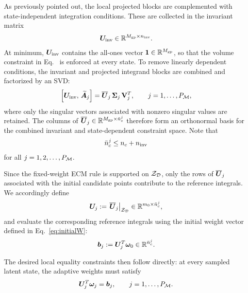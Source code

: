 \documentclass[preprint,10pt]{elsarticle}  %
\begin{document}
As previously pointed out,  the local projected blocks are complemented  with state-independent
integration conditions. These are collected in the invariant matrix
\begin{equation}
\label{eq:invariants1}
\boldsymbol{U}_{\mathrm{inv}}
\in
\mathbb{R}^{M_{\mathrm{gp}}\times n_{\mathrm{inv}}}.
\end{equation}
At minimum, \(\boldsymbol{U}_{\mathrm{inv}}\) contains the all-ones vector
\(\bm{1} \in \mathbb{R}^{M_{\mathrm{gp}}}{}\), so that the volume constraint in
Eq.~ is enforced at every
state. To remove linearly dependent conditions, the invariant and projected
integrand blocks are combined and factorized by an SVD:
\begin{equation}
\label{eq:invariants}
\left[
\boldsymbol{U}_{\mathrm{inv}},\,
\widetilde{\bm{A}}_j
\right]
=
\overline{\bm{U}}_{j}\,
\boldsymbol{\Sigma}_j\,
\mathbf{V}_j^{T},
\qquad
j=1,\ldots,P_{\mathcal{M}} ,
\end{equation}
where only the singular vectors associated with nonzero singular values
are retained. The columns of
\(\overline{\bm{U}}_{j}\in\mathbb{R}^{M_{\mathrm{gp}} \times \bar{n}_c^{j}}\)  therefore form an orthonormal
basis for the combined invariant and state-dependent constraint space. Note that
\begin{equation}
\label{eq:nconstrainsBOUND}
  \bar{n}_c^{j} \le  n_c + n_{\mathrm{inv}}
\end{equation}
for all $j=1,2,\ldots,P_{\mathcal{M}}$.



Since the fixed-weight ECM rule is supported on \(\mathcal{Z}_{\mathcal{D}}\), only the rows
of \(\overline{\bm{U}}_{j}\) associated with the initial candidate points contribute
to the reference integrals. We accordingly define
\begin{equation}
\label{eq:local_constraint_system_definition}
\bm{U}_{j}
:=
\left.\overline{\bm{U}}_{j}\right|_{\mathcal{Z}_{\mathcal{D}}}
\in
\mathbb{R}^{m_0\times\bar{n}_c^{j}},
\end{equation}
and evaluate the corresponding reference integrals using the initial
weight vector defined in Eq.~\ref{eq:initialW}:
\begin{equation}
\label{eq:local_reference_integrals}
\bm{b}_{j}
:=
\bm{U}_{j}^{T}\bm{\omega}_0
\in
\mathbb{R}^{\bar{n}_c^{j}}.
\end{equation}

The desired local equality constraints then follow directly: at every
sampled latent state, the adaptive weights must satisfy
\begin{equation}
\label{eq:constraintsLOCAL}
\bm{U}_{j}^{T}\bm{\omega}_{j}
=
\bm{b}_{j},
\qquad
j=1,\ldots,P_{\mathcal{M}} .
\end{equation}

%
\end{document}
